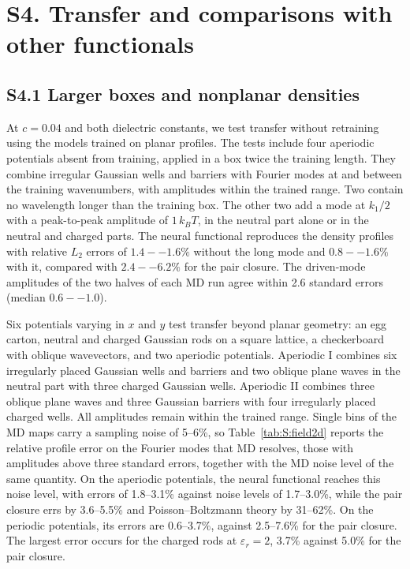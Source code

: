\section*{S4. Transfer and comparisons with other functionals}

\subsection*{S4.1 Larger boxes and nonplanar densities}
At $c=0.04$ and both dielectric constants, we test transfer
without retraining using the models trained on planar profiles.
The tests include four aperiodic potentials absent from training,
applied in a box twice the training length. They combine irregular Gaussian wells and barriers with Fourier modes at and between the training wavenumbers, with amplitudes within the trained range. Two contain no wavelength longer than the training box. The other two add a mode at $k_1/2$ with a peak-to-peak amplitude of $1\,k_BT$, in the neutral part alone or in the neutral and charged parts. The neural functional reproduces the density profiles with relative $L_2$ errors of $1.4--1.6\%$ without the long mode and $0.8--1.6\%$ with it, compared with $2.4--6.2\%$ for the pair closure. The driven-mode amplitudes of the two halves of each MD run agree within 2.6 standard errors (median $0.6--1.0$).

Six potentials varying in $x$ and $y$ test transfer beyond planar geometry: an egg carton, neutral and charged Gaussian rods on a square lattice, a checkerboard with oblique wavevectors, and two aperiodic potentials. Aperiodic I combines six irregularly placed Gaussian wells and barriers and two oblique plane waves in the neutral part with three charged Gaussian wells. Aperiodic II combines three oblique plane waves and three Gaussian barriers with four irregularly placed charged wells. All amplitudes remain within the trained range. Single bins of the MD maps carry a sampling noise of 5--6\%, so Table~\ref{tab:S:field2d} reports the relative profile error on the Fourier modes that MD resolves, those with amplitudes above three standard errors, together with the MD noise level of the same quantity. On the aperiodic potentials, the neural functional reaches this noise level, with errors of 1.8--3.1\% against noise levels of 1.7--3.0\%, while the pair closure errs by 3.6--5.5\% and Poisson--Boltzmann theory by 31--62\%. On the periodic potentials, its errors are 0.6--3.7\%, against 2.5--7.6\% for the pair closure. The largest error occurs for the charged rods at $\varepsilon_r=2$, 3.7\% against 5.0\% for the pair closure.

